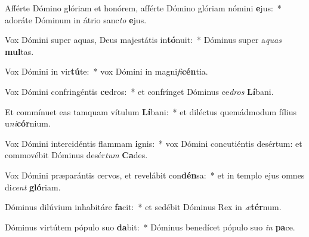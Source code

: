 \item Afférte Dómino glóriam et honórem, afférte Dómino glóriam nómini \textbf{e}jus:~* adoráte Dóminum in átrio sanc\textit{to} \textbf{e}jus.
\item Vox Dómini super aquas, Deus majestátis in\textbf{tó}nuit:~* Dóminus super a\textit{quas} \textbf{mul}tas.
\item Vox Dómini in vir\textbf{tú}te:~* vox Dómini in magni\textit{fi}\textbf{cén}tia.
\item Vox Dómini confringéntis \textbf{ce}dros:~* et confrínget Dóminus ce\textit{dros} \textbf{Lí}bani.
\item Et commínuet eas tamquam vítulum \textbf{Lí}bani:~* et diléctus quemádmodum fílius u\textit{ni}\textbf{cór}nium.
\item Vox Dómini intercidéntis flammam \textbf{i}gnis:~* vox Dómini concutiéntis desértum: et commovébit Dóminus desér\textit{tum} \textbf{Ca}des.
\item Vox Dómini præparántis cervos, et revelábit con\textbf{dén}sa:~* et in templo ejus omnes di\textit{cent} \textbf{gló}riam.
\item Dóminus dilúvium inhabitáre \textbf{fa}cit:~* et sedébit Dóminus Rex in \textit{æ}\textbf{tér}num.
\item Dóminus virtútem pópulo suo \textbf{da}bit:~* Dóminus benedícet pópulo suo \textit{in} \textbf{pa}ce.
